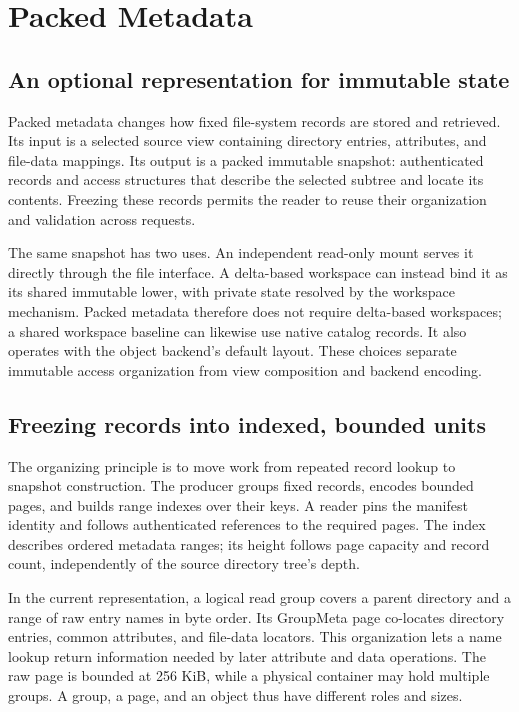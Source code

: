 \section{Packed Metadata}
\label{sec:packed}

\subsection{An optional representation for immutable state}

Packed metadata changes how fixed file-system records are stored and
retrieved. Its input is a selected source view containing directory entries,
attributes, and file-data mappings. Its output is a packed immutable
snapshot: authenticated records and access structures that describe the
selected subtree and locate its contents. Freezing these records permits
the reader to reuse their organization and validation across requests.

The same snapshot has two uses. An independent read-only mount serves it
directly through the file interface. A delta-based workspace
can instead bind it as its shared immutable lower, with private state
resolved by the workspace mechanism. Packed metadata therefore does not
require delta-based workspaces; a shared workspace baseline can likewise
use native catalog records. It also operates with the object backend's
default layout. These choices separate immutable access organization from
view composition and backend encoding.

\subsection{Freezing records into indexed, bounded units}

The organizing principle is to move work from repeated record lookup to
snapshot construction. The producer groups fixed records, encodes bounded
pages, and builds range indexes over their keys. A reader pins the manifest
identity and follows authenticated references to the required pages. The
index describes ordered metadata ranges; its height follows page capacity
and record count, independently of the source directory tree's depth.

In the current representation, a logical read group covers a parent
directory and a range of raw entry names in byte order. Its GroupMeta page
co-locates directory entries, common attributes, and file-data locators.
This organization lets a name lookup return information needed by later
attribute and data operations. The raw page is bounded at 256 KiB, while a
physical container may hold multiple groups. A group, a page, and an object
thus have different roles and sizes.

